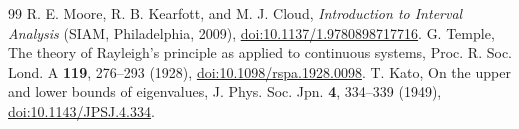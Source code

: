 \documentclass[aps,pra,reprint,superscriptaddress,longbibliography]{revtex4-2}
\begin{document}
\begin{thebibliography}{99}
 R. E. Moore, R. B. Kearfott, and M. J. Cloud, \textit{Introduction to Interval Analysis} (SIAM, Philadelphia, 2009), \href{https://doi.org/10.1137/1.9780898717716}{doi:10.1137/1.9780898717716}.
 G. Temple, The theory of Rayleigh's principle as applied to continuous systems, Proc. R. Soc. Lond. A \textbf{119}, 276--293 (1928), \href{https://doi.org/10.1098/rspa.1928.0098}{doi:10.1098/rspa.1928.0098}.
 T. Kato, On the upper and lower bounds of eigenvalues, J. Phys. Soc. Jpn. \textbf{4}, 334--339 (1949), \href{https://doi.org/10.1143/JPSJ.4.334}{doi:10.1143/JPSJ.4.334}.
\end{thebibliography}
\end{document}
